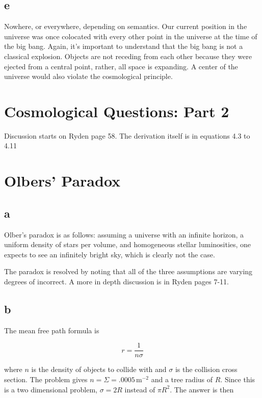 \documentclass[12pt]{article}
\begin{document}
\subsection*{e}

Nowhere, or everywhere, depending on semantics. Our current position in the universe was once colocated with every other point in the universe at the time of the big bang. Again, it's important to understand that the big bang is not a classical explosion. Objects are not receding from each other because they were ejected from a central point, rather, all space is expanding. A center of the universe would also violate the cosmological principle.


\section{Cosmological Questions: Part 2}

Discussion starts on Ryden page 58. The derivation itself is in equations 4.3 to 4.11


\section{Olbers' Paradox}

\subsection*{a}

Olber's paradox is as follows: assuming a universe with an infinite horizon, a uniform density of stars per volume, and homogeneous stellar luminosities, one expects to see an infinitely bright sky, which is clearly not the case.

The paradox is resolved by noting that all of the three assumptions are varying degrees of incorrect. A more in depth discussion is in Ryden pages 7-11.

\subsection*{b}


The mean free path formula is

\[r = \frac{1}{n\sigma}
\]


where \(n\) is the density of objects to collide with and \(\sigma\) is the collision cross section. The problem gives \(n = \Sigma = .0005 \,\mathrm{m}^{-2}\) and a tree radius of \(R\). Since this is a two dimensional problem, \(\sigma = 2R\) instead of \(\pi R^2\). The answer is then
\end{document}
